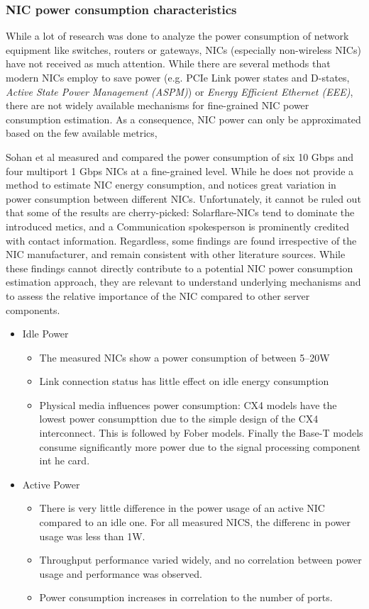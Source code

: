 \subsubsection{NIC power consumption characteristics}
While a lot of research was done to analyze the power consumption of network equipment like switches, routers or gateways, NICs (especially non-wireless NICs) have not received as much attention. While there are several methods that modern NICs employ to save power (e.g. PCIe Link power states and D-states, \textit{Active State Power Management (ASPM)}) or \textit{Energy Efficient Ethernet (EEE)}, there are not widely available mechanisms for fine-grained NIC power consumption estimation. As a consequence, NIC power can only be approximated based on the few available metrics, 

Sohan et al\parencite{sohanCharacterizing10Gbps2010} measured and compared the power consumption of six 10 Gbps and four multiport 1 Gbps NICs at a fine-grained level. While he does not provide a method to estimate NIC energy consumption, and notices great variation in power consumption between different NICs. Unfortunately, it cannot be ruled out that some of the results are cherry-picked: Solarflare-NICs tend to dominate the introduced metics, and a Communication spokesperson is prominently credited with contact information. Regardless, some findings are found irrespective of the NIC manufacturer, and remain consistent with other literature sources\parencite{gough2015energy}. While these findings cannot directly contribute to a potential NIC power consumption estimation approach, they are relevant to understand underlying mechanisms and to assess the relative importance of the NIC compared to other server components.
\begin{itemize}
    \item Idle Power
    \begin{itemize}
        \item The measured NICs show a power consumption of between 5--20W
        \item Link connection status has little effect on idle energy consumption
        \item Physical media influences power consumption: CX4 models have the lowest power consumpttion due to the simple design of the CX4 interconnect. This is followed by Fober models. Finally the Base-T models consume significantly more power due to the signal processing component int he card.
    \end{itemize}
    \item Active Power
    \begin{itemize}
        \item There is very little difference in the power usage of an active NIC compared to an idle one. For all measured NICS, the differenc in power usage was less than 1W.
        \item Throughput performance varied widely, and no correlation between power usage and performance was observed.
        \item Power consumption increases in correlation to the number of ports. 
    \end{itemize}
\end{itemize}

